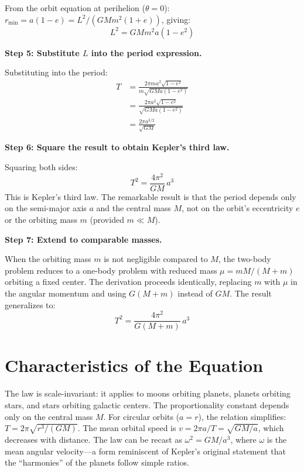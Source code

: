 From the orbit equation at perihelion ($\theta = 0$): $r_{\text{min}} = a(1-e) = L^2/(GMm^2(1+e))$, giving:
\begin{equation}
L^2 = GMm^2 a(1-e^2)
\end{equation}

\textbf{Step 5: Substitute $L$ into the period expression.}

Substituting into the period:
\begin{align}
T &= \frac{2\pi m a^2\sqrt{1-e^2}}{m\sqrt{GMa(1-e^2)}} \nonumber\\
&= \frac{2\pi a^2\sqrt{1-e^2}}{\sqrt{GMa(1-e^2)}} \nonumber\\
&= \frac{2\pi a^{3/2}}{\sqrt{GM}}
\end{align}

\textbf{Step 6: Square the result to obtain Kepler's third law.}

Squaring both sides:
\begin{equation}
T^2 = \frac{4\pi^2}{GM}\,a^3
\end{equation}
This is Kepler's third law. The remarkable result is that the period depends only on the semi-major axis $a$ and the central mass $M$, not on the orbit's eccentricity $e$ or the orbiting mass $m$ (provided $m \ll M$).

\textbf{Step 7: Extend to comparable masses.}

When the orbiting mass $m$ is not negligible compared to $M$, the two-body problem reduces to a one-body problem with reduced mass $\mu = mM/(M+m)$ orbiting a fixed center. The derivation proceeds identically, replacing $m$ with $\mu$ in the angular momentum and using $G(M+m)$ instead of $GM$. The result generalizes to:
\begin{equation}
T^2 = \frac{4\pi^2}{G(M+m)}\,a^3
\end{equation}

\section*{Characteristics of the Equation}

The law is scale-invariant: it applies to moons orbiting planets, planets orbiting stars, and stars orbiting galactic centers. The proportionality constant depends only on the central mass $M$. For circular orbits ($a = r$), the relation simplifies: $T = 2\pi\sqrt{r^3/(GM)}$. The mean orbital speed is $v = 2\pi a/T = \sqrt{GM/a}$, which decreases with distance. The law can be recast as $\omega^2 = GM/a^3$, where $\omega$ is the mean angular velocity---a form reminiscent of Kepler's original statement that the ``harmonies'' of the planets follow simple ratios.
